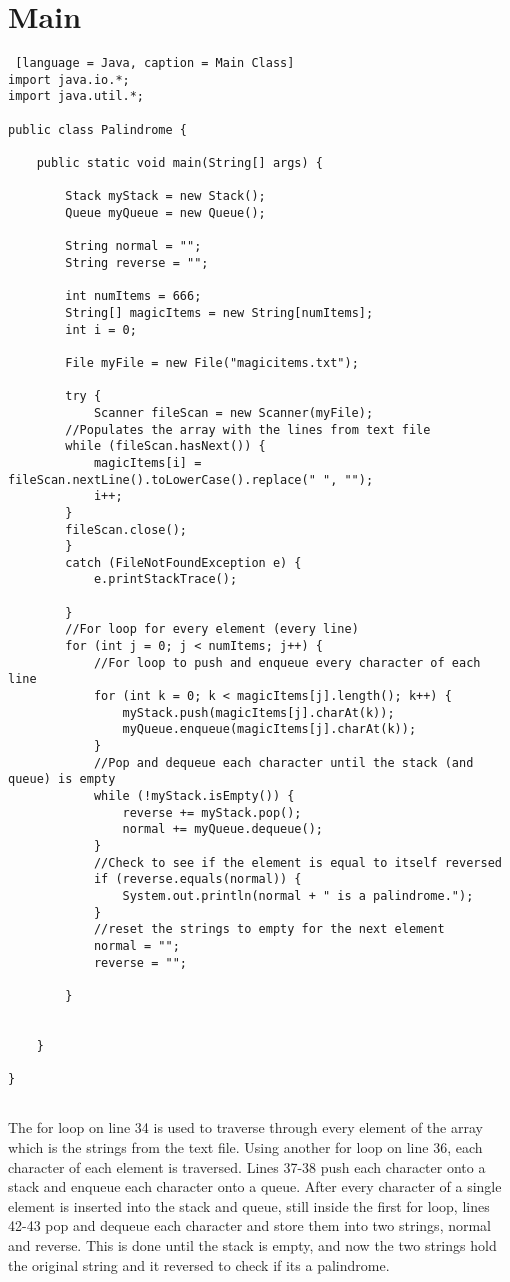 \documentclass{article}
\begin{document}
\section{Main}
\begin{lstlisting} [language = Java, caption = Main Class]
import java.io.*;
import java.util.*;

public class Palindrome {

    public static void main(String[] args) {

        Stack myStack = new Stack();
        Queue myQueue = new Queue();

        String normal = "";
        String reverse = "";

        int numItems = 666;
        String[] magicItems = new String[numItems];
        int i = 0;

        File myFile = new File("magicitems.txt");

        try {
            Scanner fileScan = new Scanner(myFile);
        //Populates the array with the lines from text file
        while (fileScan.hasNext()) {
            magicItems[i] = fileScan.nextLine().toLowerCase().replace(" ", "");
            i++;
        }
        fileScan.close();            
        }
        catch (FileNotFoundException e) {
            e.printStackTrace();

        }
        //For loop for every element (every line)
        for (int j = 0; j < numItems; j++) {
            //For loop to push and enqueue every character of each line
            for (int k = 0; k < magicItems[j].length(); k++) {
                myStack.push(magicItems[j].charAt(k));
                myQueue.enqueue(magicItems[j].charAt(k));
            }
            //Pop and dequeue each character until the stack (and queue) is empty
            while (!myStack.isEmpty()) {
                reverse += myStack.pop();
                normal += myQueue.dequeue();
            }
            //Check to see if the element is equal to itself reversed
            if (reverse.equals(normal)) {
                System.out.println(normal + " is a palindrome.");
            }
            //reset the strings to empty for the next element
            normal = "";
            reverse = "";
            
        }

        
    }
    
}


\end{lstlisting}
\noindent
The for loop on line 34 is used to traverse through every element of the array which is the strings from the text file. Using another for loop on line 36, each character of each element is traversed. Lines 37-38 push each character onto a stack and enqueue each character onto a queue. After every character of a single element is inserted into the stack and queue, still inside the first for loop, lines 42-43 pop and dequeue each character and store them into two strings, normal and reverse. This is done until the stack is empty, and now the two strings hold the original string and it reversed to check if its a palindrome.  
\end{document}
